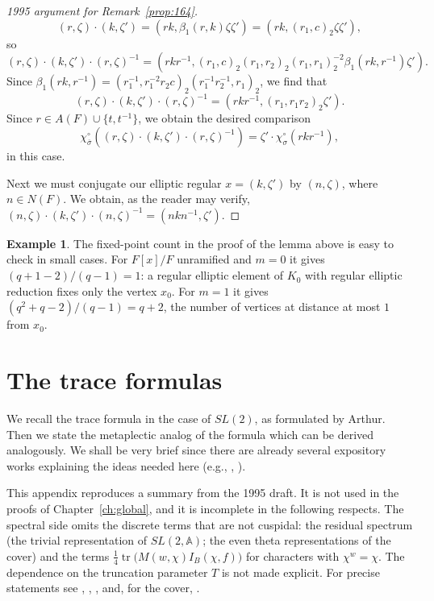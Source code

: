 \documentclass[12pt,letterpaper,openany]{book}
\theoremstyle{plain}
\theoremstyle{definition}
\newtheorem{example}[theorem]{Example}
\theoremstyle{remark}
\theoremstyle{remark}
\newcommand{\tr}{\operatorname{tr}}
\begin{document}
\begin{proof}[1995 argument for Remark~\ref{prop:164}]
$$
(r,\zeta)\cdot (k,\zeta')
=(rk,\beta_1 (r,k)\zeta\zeta' )=(rk,(r_1,c)_2\zeta\zeta' ),
$$
so
$$
(r,\zeta)\cdot (k,\zeta')\cdot ( r,\zeta)^{-1}
=(rkr^{-1}, (r_1,c)_2(r_1,r_2)_2(r_1,r_1)_2^{-2}\beta_1 (rk, r^{-1})\zeta' ).
$$
Since
$\beta_1 (rk, r^{-1})=(r_1^{-1},r_1^{-2}r_2c)_2(r_1^{-1}r_2^{-1},r_1)_2$,
we find that
$$
(r,\zeta)\cdot (k,\zeta')\cdot ( r,\zeta)^{-1}
=(rkr^{-1}, (r_1,r_1r_2)_2\zeta' ).
$$
Since $r\in A(F)\cup \{t,t^{-1}\}$, we obtain the desired comparison
$$
\chi_{\overline{\sigma}}^\circ ((r,\zeta)
\cdot (k,\zeta')\cdot ( r,\zeta)^{-1})
=\zeta'\cdot \chi_{\sigma}^\circ (rkr^{-1}),
$$
in this case.
\par
Next we must conjugate our elliptic regular $x=(k,\zeta')$ by
$(n,\zeta)$, where $n\in N(F)$. We obtain, as the reader may verify,
$(n,\zeta)\cdot (k,\zeta')\cdot (n,\zeta)^{-1}=(nkn^{-1},\zeta')$.
\end{proof}



\begin{example}
The fixed-point count in the proof of the lemma above is easy to check in small cases.
For $F[x]/F$ unramified and $m=0$ it gives
$(q+1-2)/(q-1)=1$: a regular elliptic element of $K_0$ with regular
elliptic reduction fixes only the vertex $x_0$. For $m=1$ it gives
$(q^2+q-2)/(q-1)=q+2$, the number of vertices at distance at most $1$ from
$x_0$.
\end{example}


\chapter{The trace formulas}\label{ch:tf}

We recall the trace formula in the case of $SL(2)$, as formulated by
Arthur. Then we state the metaplectic analog of the formula which
can be derived analogously. We shall be very brief since there are
already several expository works explaining the ideas needed here
(e.g., \cite{A15}, \cite{MW}).

This appendix reproduces a summary from the 1995 draft. It is not used in
the proofs of Chapter~\ref{ch:global}, and it is incomplete in the
following respects. The spectral side omits the discrete terms that are
not cuspidal: the residual spectrum (the trivial representation of
$SL(2,{\mathbb A})$; the even theta representations of the cover) and the
terms $\frac14\tr\bigl(M(w,\chi)I_B(\chi,f)\bigr)$ for characters with
$\chi^w=\chi$. The dependence on the truncation parameter $T$ is not made
explicit. For precise statements see \cite{A2}, \cite{A3}, \cite{A6}, and,
for the cover, \cite{Li21}.
\end{document}
